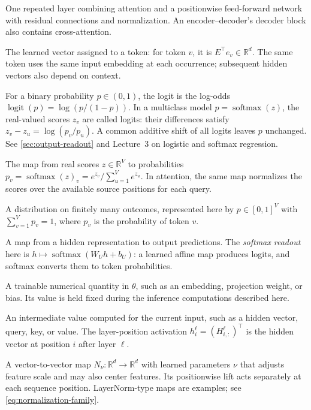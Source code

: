 \documentclass[11pt,twoside]{article}
\DeclareMathOperator{\softmax}{softmax}
\newcommand{\R}{\mathbb R}
\theoremstyle{plain}
\theoremstyle{definition}
\theoremstyle{remark}
\begin{document}
\begin{description}[style=nextline,leftmargin=1.5em,labelindent=0pt]
\item[Transformer block]
One repeated layer combining attention and a positionwise feed-forward network
with residual connections and normalization. An encoder--decoder's decoder
block also contains cross-attention.
\item[Embedding]
The learned vector assigned to a token: for token $v$, it is
$E^\top e_v\in\R^d$. The same token uses the same input embedding at each
occurrence; subsequent hidden vectors also depend on context.
\item[Logit]
For a binary probability $p\in(0,1)$, the logit is the log-odds
$\operatorname{logit}(p)=\log(p/(1-p))$.
In a multiclass model $p=\softmax(z)$, the real-valued scores $z_v$ are called
logits: their differences satisfy $z_v-z_u=\log(p_v/p_u)$. A common
additive shift of all logits leaves $p$ unchanged. See
\cref{sec:output-readout} and Lecture~3 on logistic and softmax regression.
\item[Softmax]
The map from real scores $z\in\R^V$ to probabilities
$p_v=\softmax(z)_v=e^{z_v}/\sum_{u=1}^V e^{z_u}$.
In attention, the same map normalizes the scores over the available source
positions for each query.
\item[Categorical distribution]
A distribution on finitely many outcomes, represented here by
$p\in[0,1]^V$ with $\sum_{v=1}^V p_v=1$, where $p_v$ is the probability
of token $v$.
\item[Readout; output head]
A map from a hidden representation to output predictions. The
\emph{softmax readout} here is $h\mapsto\softmax(W_Uh+b_U)$: a learned
affine map produces logits, and softmax converts them to token probabilities.
\item[Parameter]
A trainable numerical quantity in $\theta$, such as an embedding, projection
weight, or bias. Its value is held fixed during the inference computations
described here.
\item[Activation; layer-position activation]
An intermediate value computed for the current input, such as a hidden
vector, query, key, or value. The layer-position activation
$h_i^\ell=(H^\ell_{i,:})^\top$ is the hidden vector at position $i$
after layer $\ell$.
\item[Normalization map]
A vector-to-vector map $N_\nu:\R^d\to\R^d$ with learned parameters $\nu$
that adjusts feature scale and may also center features. Its positionwise lift
acts separately at each sequence position. LayerNorm-type maps are examples; see
\cref{eq:normalization-family}.
\item[Layer normalization (LayerNorm)]

\end{description}
\end{document}
